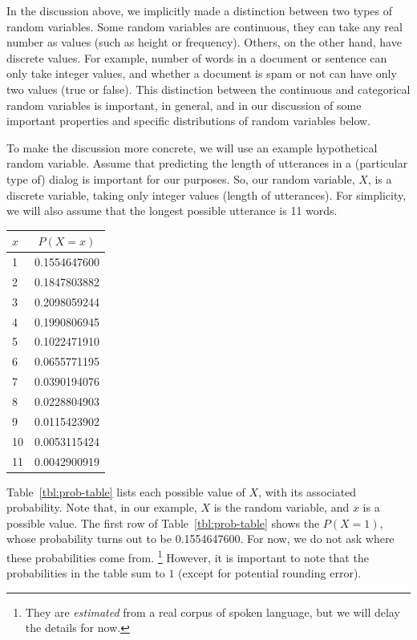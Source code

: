 In the discussion above,
we implicitly made a distinction between two types of random variables.
Some random variables are continuous,
they can take any real number as values
(such as height or frequency).
Others, on the other hand, have discrete values.
For example,
number of words in a document or sentence can only take integer values,
and whether a document is spam or not can have only two values (true or false).
This distinction between the continuous
and categorical random variables is important, in general,
and in our discussion of some important properties
and specific distributions of random variables below.

To make the discussion more concrete,
we will use an example hypothetical random variable.
Assume that predicting the length of utterances
in a (particular type of) dialog is important for our purposes.
So, our random variable, $X$, is a discrete variable,
taking only integer values (length of utterances).
For simplicity,
we will also assume that the longest possible utterance is \num{11} words.
\begin{margintable}
  \caption{\label{tbl:prob-table}%
    Probabilities of all possible values ($x$)
    of an example random variable $X$ (utterance lengths).
  }
  \begin{center}
    \begin{tabular}{lS[round-precision=3]}
      \toprule
      $x$ & {$P(X = x)$} \\
      &0.1554647600\\
      2&0.1847803882\\
      3&0.2098059244\\
      4&0.1990806945\\
      5&0.1022471910\\
      6&0.0655771195\\
      7&0.0390194076\\
      8&0.0228804903\\
      9&0.0115423902\\
     10&0.0053115424\\
     11&0.0042900919\\
      \bottomrule
    \end{tabular}
  \end{center}
\end{margintable}
Table~\ref{tbl:prob-table} lists each possible value of $X$,
with its associated probability.
Note that, in our example, $X$ is the random variable,
and $x$ is a possible value.
The first row of Table~\ref{tbl:prob-table} shows the $P(X=1)$,
whose probability turns out to be \num[round-precision=3]{0.1554647600}.
For now, we do not ask where these probabilities come from.%
\footnote{They are \emph{estimated} from a real corpus of spoken language,
but we will delay the details for now.
}
However,
it is important to note that the probabilities in the table sum to $1$
(except for potential rounding error).

